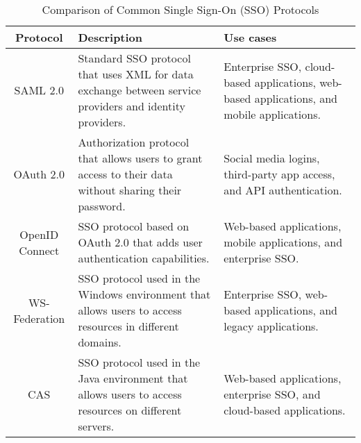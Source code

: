 \documentclass[a4paper,12pt,oneside]{mybook}
\begin{document}
\begin{table}[htbp]
    \centering
    \begin{tabularx}{\textwidth}{|c|X|X|}
        \hline  
        Protocol & Description & Use cases \\
        \hline
        SAML 2.0 & Standard SSO protocol that uses XML for data exchange between service providers and identity providers. & Enterprise SSO, cloud-based applications, web-based applications, and mobile applications.\\
        \hline
        OAuth 2.0 & Authorization protocol that allows users to grant access to their data without sharing their password. & Social media logins, third-party app access, and API authentication. \\
        \hline
        OpenID Connect & SSO protocol based on OAuth 2.0 that adds user authentication capabilities. & Web-based applications, mobile applications, and enterprise SSO. \\
        \hline
        WS-Federation & SSO protocol used in the Windows environment that allows users to access resources in different domains. & Enterprise SSO, web-based applications, and legacy applications. \\
        \hline
        CAS & SSO protocol used in the Java environment that allows users to access resources on different servers. & Web-based applications, enterprise SSO, and cloud-based applications. \\
        \hline
    \end{tabularx}
    \caption{Comparison of Common Single Sign-On (SSO) Protocols}
    \label{sso_table}
\end{table}
\end{document}
